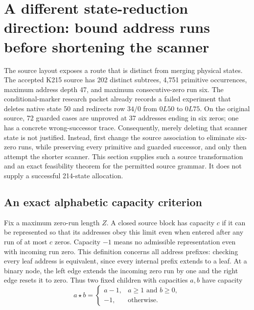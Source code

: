 \section{A different state-reduction direction: bound address runs before shortening the scanner}
\label{sec:runlength}

The source layout exposes a route that is distinct from merging physical
states.  The accepted K215 source has 202 distinct subtrees, 4,751 primitive
occurrences, maximum address depth 47, and maximum consecutive-zero run six.
The conditional-marker research packet already records a failed experiment
that deletes native state 50 and redirects row $34/0$ from $0L50$ to $0L75$.
On the original source, 72 guarded cases are unproved at 37 addresses ending
in six zeros; one has a concrete wrong-successor trace.  Consequently, merely
deleting that scanner state is not justified.  Instead, first change the
source association to eliminate six-zero runs, while preserving every
primitive and guarded successor, and only then attempt the shorter scanner.
This section supplies such a source transformation and an exact feasibility
theorem for the permitted source grammar.  It does not supply a successful
214-state allocation.

\subsection{An exact alphabetic capacity criterion}

Fix a maximum zero-run length $Z$.  A closed source block has capacity $c$ if
it can be represented so that its addresses obey this limit even when entered
after any run of at most $c$ zeros.  Capacity $-1$ means no admissible
representation even with incoming run zero.  This definition concerns all
address prefixes: checking every leaf address is equivalent, since every
internal prefix extends to a leaf.  At a binary node, the left edge extends
the incoming zero run by one and the right edge resets it to zero.  Thus two
fixed children with capacities $a,b$ have capacity
\[
 a\mathbin{\star}b=
 \begin{cases}a-1,&a\ge1\text{ and }b\ge0,\\-1,&\text{otherwise.}\end{cases}
\]

